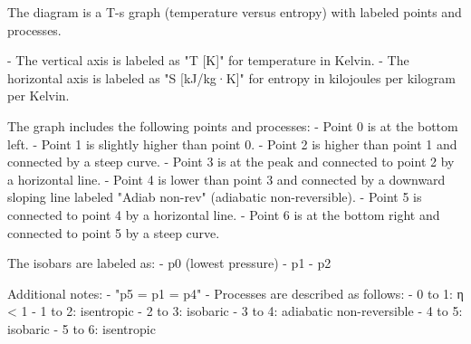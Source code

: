 The diagram is a T-s graph (temperature versus entropy) with labeled points and processes.  

- The vertical axis is labeled as "T [K]" for temperature in Kelvin.  
- The horizontal axis is labeled as "S [kJ/kg·K]" for entropy in kilojoules per kilogram per Kelvin.  

The graph includes the following points and processes:  
- Point 0 is at the bottom left.  
- Point 1 is slightly higher than point 0.  
- Point 2 is higher than point 1 and connected by a steep curve.  
- Point 3 is at the peak and connected to point 2 by a horizontal line.  
- Point 4 is lower than point 3 and connected by a downward sloping line labeled "Adiab non-rev" (adiabatic non-reversible).  
- Point 5 is connected to point 4 by a horizontal line.  
- Point 6 is at the bottom right and connected to point 5 by a steep curve.  

The isobars are labeled as:  
- p0 (lowest pressure)  
- p1  
- p2  

Additional notes:  
- "p5 = p1 = p4"  
- Processes are described as follows:  
  - 0 to 1: η < 1  
  - 1 to 2: isentropic  
  - 2 to 3: isobaric  
  - 3 to 4: adiabatic non-reversible  
  - 4 to 5: isobaric  
  - 5 to 6: isentropic
